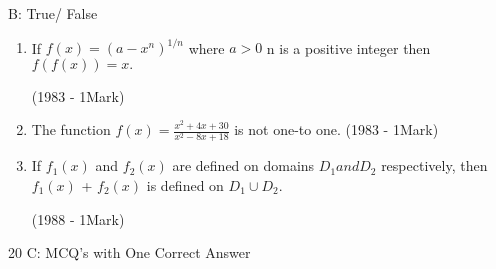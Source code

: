 \documentclass[journal,12pt,twocolumn]{IEEEtran}
\theoremstyle{remark}
\begin{document}
\begin{flushleft}
\fontsize{18}{20}\selectfont
{B: True/ False }
\end{flushleft}


\begin{enumerate}

\item If $f(x)=(a-x^n)^{1/n}$ where $a>0$ n is a positive integer 
then $f(f(x))=x.$


    \hfill
    {(1983 - 1Mark)}
\item The function $f(x)={\frac{x^2+4x+30}{x^2-8x+18}}$ is not one-to one.
\hfill
{(1983 - 1Mark)}




\item If $f{_1}(x)$
 and  $f{_2}(x)$ are  defined on domains $D{_1} and D{_2}$ respectively, then $f{_1}(x)$ + $f{_2}(x)$ is defined on $D{_1}\cup D{_2}$.


\hfill
{(1988 - 1Mark)}
\end{enumerate}

\begin{flushleft}
\fontsize{18}
{20}\selectfont
{C: MCQ's with One Correct Answer}
\end{flushleft}
\end{document}
